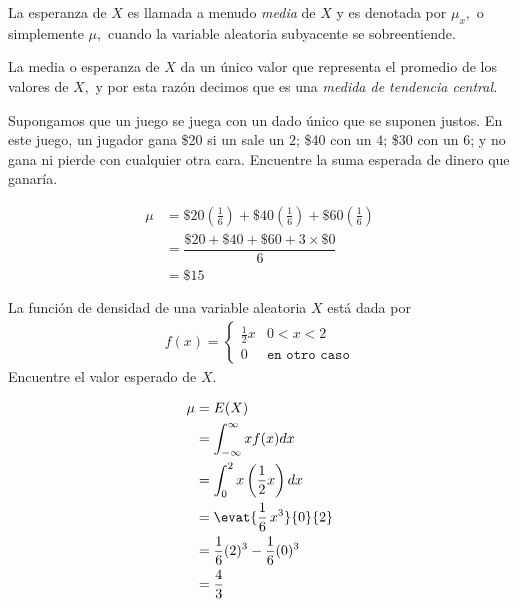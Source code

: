  La esperanza de $X$ es llamada a menudo \emph{media} de $X$ y es denotada por $\mu_{x},$ o simplemente $\mu,$ cuando la variable aleatoria subyacente se sobreentiende.


 La media o esperanza de $X$ da un único valor que representa el promedio de los valores de $X,$ y por esta razón decimos que es una \emph{medida de tendencia central.}



 \begin{ejemplo}
  \label{exmp:0.3.1}
  Supongamos que un juego se juega con un dado único que se suponen justos. En este juego, un jugador gana \$20 si un sale un $2$; \$40 con un $4$; \$30 con un $6$; y no gana ni pierde con cualquier otra cara. Encuentre la suma esperada de dinero que ganaría.
 \end{ejemplo}





 \begin{align}
 \mu &= \$ 20 \left( \frac{1}{6} \right) + \$40 \left( \frac{1}{6} \right) + \$60\left( \frac{1}{6} \right) \\
   &= \dfrac{\$20 + \$40 + \$60 + 3\times\$ 0}{6} \\
   &= \$ 15
\end{align}




 \begin{ejemplo}
  \label{exmp:0.3.2}
  La función de densidad de una variable aleatoria $X$ está dada por
  \begin{align}
   f(x)=
   \begin{cases}
    \frac{1}{2}x & 0<x<2 \\
    0 & \texttt{en otro caso}
   \end{cases}
  \end{align}
Encuentre el valor esperado de $X.$
 \end{ejemplo}



{}
\begin{align}
 \mu &= E(X)\\ & = \int_{-\infty}^{\infty} xf(x) dx \\
  &= \int_{0}^{2} x\left( \dfrac{1}{2}x \right) dx\\
  &= \evat{\frac{1}{6} \, x^{3}}{0}{2}\\
  &= \frac{1}{6}(2)^{3}-\frac{1}{6}(0)^{3} \\
  &= \frac{4}{3}
\end{align}


